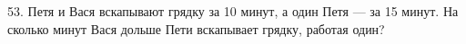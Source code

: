 53. Петя и Вася вскапывают грядку за 10 минут, а один Петя --- за 15 минут. На сколько минут Вася дольше Пети вскапывает грядку, работая один?\\
